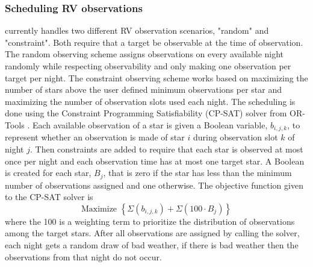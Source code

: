 \subsubsection{Scheduling RV observations}

 currently handles two different RV observation scenarios,
"random" and "constraint". Both require that a target be observable at the time
of observation. The random observing scheme assigns observations on every
available night randomly while respecting observability and only making one
observation per target per night. The constraint observing scheme works based
on maximizing the number of stars above the user defined minimum observations
per star and maximizing the number of observation slots used each night. The
scheduling is done using the Constraint Programming Satisfiability (CP-SAT)
solver from OR-Tools \citep{perronORTools2022}. Each available observation of a
star is given a Boolean variable, $b_{i,j,k}$, to represent whether an
observation is made of star $i$ during observation slot $k$ of night $j$. Then
constraints are added to require that each star is observed at most once per
night and each observation time has at most one target star. A Boolean
is created for each star, $B_j$, that is zero if the star has less than the
minimum number of observations assigned and one otherwise. The objective function
given to the CP-SAT solver is
\begin{equation}
  \textrm{Maximize }{\left\{ \Sigma\left(
  b_{i,j,k}\right) + \Sigma\left( 100 \cdot B_{j}\right)
  \right\}}
  \label{eq:rv_objective}
\end{equation}
where the 100 is a weighting term to prioritize the distribution of
observations among the target stars. After all observations are assigned by
calling the solver, each night gets a random draw of bad weather, if there is
bad weather then the observations from that night do not occur.

